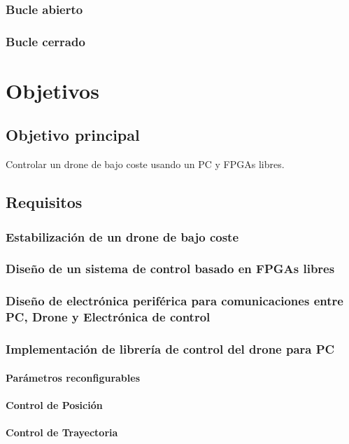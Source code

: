 \documentclass[10pt]{article}
\begin{document}
		\subsubsection{Bucle abierto}
		\subsubsection{Bucle cerrado}
		
\section{Objetivos}
	\subsection{Objetivo principal}
	Controlar un drone de bajo coste usando un PC y FPGAs libres.
	\subsection{Requisitos}
		\subsubsection{Estabilización de un drone de bajo coste}
		\subsubsection{Diseño de un sistema de control basado en FPGAs libres}
		\subsubsection{Diseño de electrónica periférica para comunicaciones entre PC, Drone y Electrónica de control}
		\subsubsection{Implementación de librería de control del drone para PC}
			\paragraph{Parámetros reconfigurables}
			\paragraph{Control de Posición}
			\paragraph{Control de Trayectoria}
\end{document}
